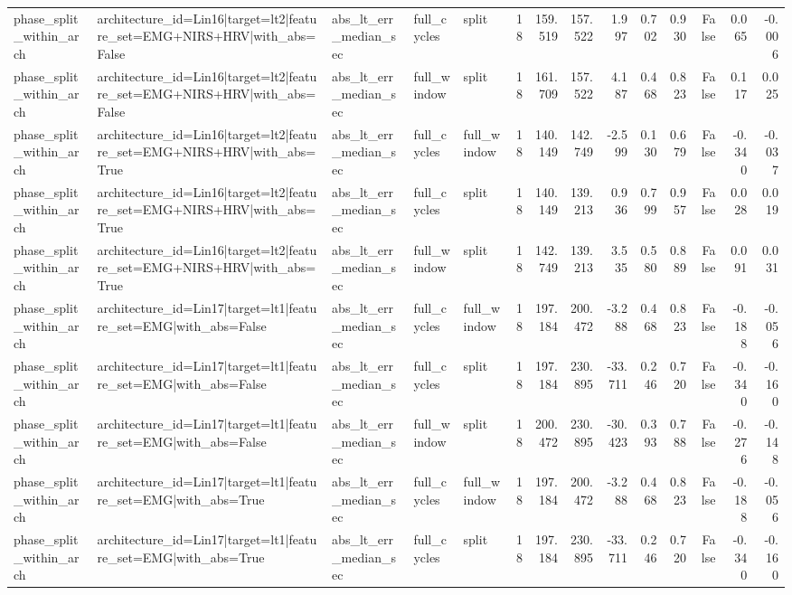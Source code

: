 \begin{table}
\begin{tabular}{lllllrrrrrrrrr}
phase_split_within_arch & architecture_id=Lin16|target=lt2|feature_set=EMG+NIRS+HRV|with_abs=False & abs_lt_err_median_sec & full_cycles & split & 18 & 159.519 & 157.522 & 1.997 & 0.702 & 0.930 & False & 0.065 & -0.006 \\
phase_split_within_arch & architecture_id=Lin16|target=lt2|feature_set=EMG+NIRS+HRV|with_abs=False & abs_lt_err_median_sec & full_window & split & 18 & 161.709 & 157.522 & 4.187 & 0.468 & 0.823 & False & 0.117 & 0.025 \\
phase_split_within_arch & architecture_id=Lin16|target=lt2|feature_set=EMG+NIRS+HRV|with_abs=True & abs_lt_err_median_sec & full_cycles & full_window & 18 & 140.149 & 142.749 & -2.599 & 0.130 & 0.679 & False & -0.340 & -0.037 \\
phase_split_within_arch & architecture_id=Lin16|target=lt2|feature_set=EMG+NIRS+HRV|with_abs=True & abs_lt_err_median_sec & full_cycles & split & 18 & 140.149 & 139.213 & 0.936 & 0.799 & 0.957 & False & 0.028 & 0.019 \\
phase_split_within_arch & architecture_id=Lin16|target=lt2|feature_set=EMG+NIRS+HRV|with_abs=True & abs_lt_err_median_sec & full_window & split & 18 & 142.749 & 139.213 & 3.535 & 0.580 & 0.889 & False & 0.091 & 0.031 \\
phase_split_within_arch & architecture_id=Lin17|target=lt1|feature_set=EMG|with_abs=False & abs_lt_err_median_sec & full_cycles & full_window & 18 & 197.184 & 200.472 & -3.288 & 0.468 & 0.823 & False & -0.188 & -0.056 \\
phase_split_within_arch & architecture_id=Lin17|target=lt1|feature_set=EMG|with_abs=False & abs_lt_err_median_sec & full_cycles & split & 18 & 197.184 & 230.895 & -33.711 & 0.246 & 0.720 & False & -0.340 & -0.160 \\
phase_split_within_arch & architecture_id=Lin17|target=lt1|feature_set=EMG|with_abs=False & abs_lt_err_median_sec & full_window & split & 18 & 200.472 & 230.895 & -30.423 & 0.393 & 0.788 & False & -0.276 & -0.148 \\
phase_split_within_arch & architecture_id=Lin17|target=lt1|feature_set=EMG|with_abs=True & abs_lt_err_median_sec & full_cycles & full_window & 18 & 197.184 & 200.472 & -3.288 & 0.468 & 0.823 & False & -0.188 & -0.056 \\
phase_split_within_arch & architecture_id=Lin17|target=lt1|feature_set=EMG|with_abs=True & abs_lt_err_median_sec & full_cycles & split & 18 & 197.184 & 230.895 & -33.711 & 0.246 & 0.720 & False & -0.340 & -0.160 \\

\end{tabular}
\end{table}
